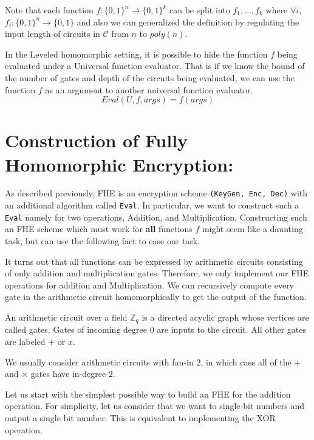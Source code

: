 \documentclass[usletter]{article}
\begin{document}
Note that each function $f:\{0,1\}^n\rightarrow\{0,1\}^k$ can be split into $f_1,\dots,f_k$ where $\forall i$, $f_i:\{0,1\}^n\rightarrow\{0,1\}$ and also we can generalized the definition by regulating the input length of circuits in $\mathcal{C}$ from $n$ to $poly(n)$.



\begin{remark}
    In the Leveled homomorphic setting, it is possible to hide the function $f$ being evaluated under a Universal function evaluator. That is if we know the bound of the number of gates and depth of the circuits being evaluated, we can use the function $f$ as an argument to another universal function evaluator.
    $$Eval(U, f, args) = f(args)$$
\end{remark}

\section{Construction of Fully Homomorphic Encryption:}
As described previously, FHE is an encryption scheme \texttt{(KeyGen, Enc, Dec)} 
with an additional algorithm called \texttt{Eval}. In particular, we want to construct such a \texttt{Eval} namely for two operations, Addition, and Multiplication. Constructing such an FHE scheme which must work for \textbf{all} functions $f$ might seem like a daunting task, 
but can use the following fact to ease our task.
\begin{fact}
It turns out that all functions can be expressed by arithmetic circuits consisting
of only addition and multiplication gates. Therefore, we only implement our FHE operations for addition and Multiplication. We can recursively compute every gate in the arithmetic circuit homomorphically to get the output of the function. 
\end{fact}

\begin{definition}
An arithmetic circuit over a field $\mathbb{Z}_q$ is a directed
acyclic graph whose vertices are called gates. Gates of incoming degree $0$ are inputs to
the circuit. All other gates are labeled $+$ or $x$. 
\end{definition}
We usually consider arithmetic circuits with fan-in $2$, in which case all of the $+$ and $\times$ gates have in-degree $2$.

Let us start with the simplest possible way to build an FHE for the addition operation. 
For simplicity, let us consider that we want to single-bit numbers and output a single bit number. This is equivalent to implementing the XOR operation. 
\end{document}
